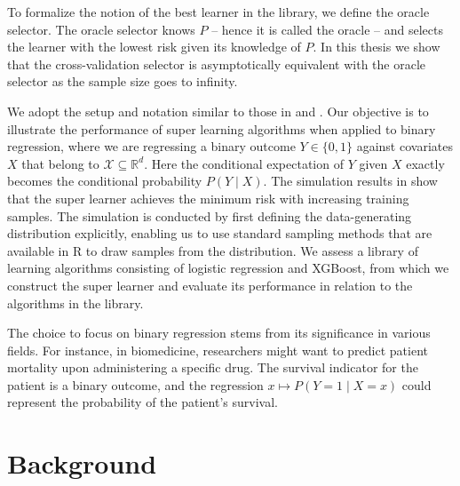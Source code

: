 \documentclass[11pt, a4paper]{article}
\theoremstyle{definition}
\theoremstyle{remark}
\begin{document}
To formalize the notion of the best learner in the library, we define the oracle selector. The oracle selector knows $ P $ -- hence it is called the oracle -- and selects the learner with the lowest risk given its knowledge of $ P $. In this thesis we show that the cross-validation selector is asymptotically equivalent with the oracle selector as the sample size goes to infinity. 

We adopt the setup and notation similar to those in \citet{vaart06} and \citet{laan03}. Our objective is to illustrate the performance of super learning algorithms when applied to binary regression, where we are regressing a binary outcome $ Y \in \{0,1\} $ against covariates $ X $ that belong to $ \mathcal{X} \subseteq \mathbb{R}^{d} $. Here the conditional expectation of $ Y $ given $ X $ exactly becomes the conditional probability $ P(Y \mid X) $. The simulation results in  show that the super learner achieves the minimum risk with increasing training samples. The simulation is conducted by first defining the data-generating distribution explicitly, enabling us to use standard sampling methods that are available in R to draw samples from the distribution. We assess a library of learning algorithms consisting of logistic regression and XGBoost, from which we construct the super learner and evaluate its performance in relation to the algorithms in the library.

The choice to focus on binary regression stems from its significance in various fields. For instance, in biomedicine, researchers might want to predict patient mortality upon administering a specific drug. The survival indicator for the patient is a binary outcome, and the regression $ x \mapsto P(Y = 1 \mid X = x) $ could represent the probability of the patient's survival. 

\section{Background}
\end{document}
